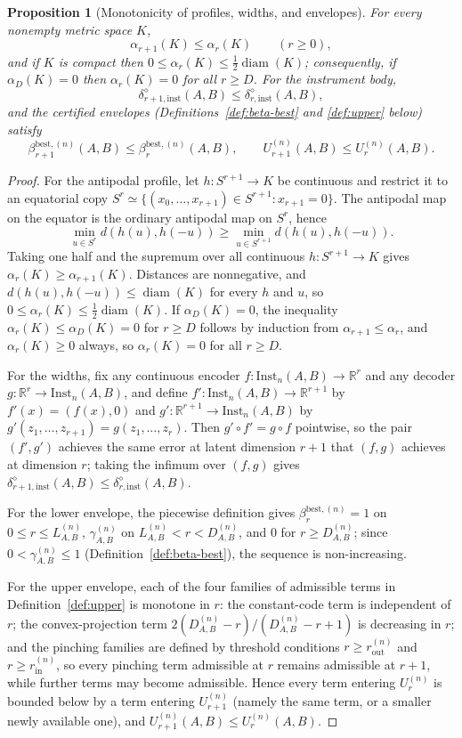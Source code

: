 \documentclass[11pt,a4paper]{article}
\newtheorem{proposition}[theorem]{Proposition}
\newcommand{\Inst}{\mathrm{Inst}}
\newcommand{\diam}{\operatorname{diam}}
\begin{document}
\begin{proposition}[Monotonicity of profiles, widths, and envelopes]
\label{prop:monotonicity}
For every nonempty metric space $K$,
\[
\alpha_{r+1}(K)\le\alpha_r(K)\qquad(r\ge0),
\]
and if $K$ is compact then $0\le\alpha_r(K)\le\tfrac12\diam(K)$; consequently, if $\alpha_D(K)=0$ then $\alpha_r(K)=0$ for all $r\ge D$. For the instrument body,
\[
\delta_{r+1,\mathrm{inst}}^{\diamond}(A,B)\le\delta_{r,\mathrm{inst}}^{\diamond}(A,B),
\]
and the certified envelopes (Definitions~\ref{def:beta-best} and \ref{def:upper} below) satisfy
\[
\beta_{r+1}^{\mathrm{best},(n)}(A,B)\le\beta_r^{\mathrm{best},(n)}(A,B),\qquad
U_{r+1}^{(n)}(A,B)\le U_r^{(n)}(A,B).
\]
\end{proposition}

\begin{proof}
For the antipodal profile, let $h:S^{r+1}\to K$ be continuous and restrict it to an equatorial copy $S^r\simeq\{(x_0,\dots,x_{r+1})\in S^{r+1}:x_{r+1}=0\}$. The antipodal map on the equator is the ordinary antipodal map on $S^r$, hence
\[
\min_{u\in S^r}d(h(u),h(-u))
\ge\min_{u\in S^{r+1}}d(h(u),h(-u)).
\]
Taking one half and the supremum over all continuous $h:S^{r+1}\to K$ gives $\alpha_r(K)\ge\alpha_{r+1}(K)$. Distances are nonnegative, and $d(h(u),h(-u))\le\diam(K)$ for every $h$ and $u$, so $0\le\alpha_r(K)\le\tfrac12\diam(K)$. If $\alpha_D(K)=0$, the inequality $\alpha_r(K)\le\alpha_D(K)=0$ for $r\ge D$ follows by induction from $\alpha_{r+1}\le\alpha_r$, and $\alpha_r(K)\ge0$ always, so $\alpha_r(K)=0$ for all $r\ge D$.

For the widths, fix any continuous encoder $f:\Inst_n(A,B)\to\mathbb R^r$ and any decoder $g:\mathbb R^r\to\Inst_n(A,B)$, and define $f':\Inst_n(A,B)\to\mathbb R^{r+1}$ by $f'(x)=(f(x),0)$ and $g':\mathbb R^{r+1}\to\Inst_n(A,B)$ by $g'(z_1,\dots,z_{r+1})=g(z_1,\dots,z_r)$. Then $g'\circ f'=g\circ f$ pointwise, so the pair $(f',g')$ achieves the same error at latent dimension $r+1$ that $(f,g)$ achieves at dimension $r$; taking the infimum over $(f,g)$ gives $\delta_{r+1,\mathrm{inst}}^{\diamond}(A,B)\le\delta_{r,\mathrm{inst}}^{\diamond}(A,B)$.

For the lower envelope, the piecewise definition gives $\beta_r^{\mathrm{best},(n)}=1$ on $0\le r\le L_{A,B}^{(n)}$, $\gamma_{A,B}^{(n)}$ on $L_{A,B}^{(n)}<r<D_{A,B}^{(n)}$, and $0$ for $r\ge D_{A,B}^{(n)}$; since $0<\gamma_{A,B}^{(n)}\le1$ (Definition~\ref{def:beta-best}), the sequence is non-increasing.

For the upper envelope, each of the four families of admissible terms in Definition~\ref{def:upper} is monotone in $r$: the constant-code term is independent of $r$; the convex-projection term $2(D_{A,B}^{(n)}-r)/(D_{A,B}^{(n)}-r+1)$ is decreasing in $r$; and the pinching families are defined by threshold conditions $r\ge r_{\mathrm{out}}^{(n)}$ and $r\ge r_{\mathrm{in}}^{(n)}$, so every pinching term admissible at $r$ remains admissible at $r+1$, while further terms may become admissible. Hence every term entering $U_r^{(n)}$ is bounded below by a term entering $U_{r+1}^{(n)}$ (namely the same term, or a smaller newly available one), and $U_{r+1}^{(n)}(A,B)\le U_r^{(n)}(A,B)$.
\end{proof}
\end{document}
